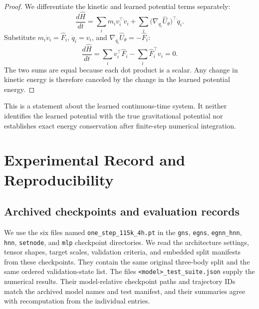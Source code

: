 \documentclass[10pt,letterpaper,twocolumn]{article}
\newcommand{\Fhat}{\widehat F}
\newcommand{\Uhat}{\widehat U}
\numberwithin{equation}{section}
\begin{document}
\begin{proof}
We differentiate the kinetic and learned potential terms separately:
\[
\frac{d\widehat H}{dt}
=\sum_i m_iv_i^\top\dot v_i
+\sum_i\bigl(\nabla_{q_i}\Uhat_\theta\bigr)^\top\dot q_i.
\]
Substitute $m_i\dot v_i=\Fhat_i$, $\dot q_i=v_i$, and
$\nabla_{q_i}\Uhat_\theta=-\Fhat_i$:
\[
\frac{d\widehat H}{dt}
=\sum_i v_i^\top\Fhat_i-\sum_i\Fhat_i^\top v_i=0.
\]
The two sums are equal because each dot product is a scalar. Any change in kinetic energy is
therefore canceled by the change in the learned potential energy.
\end{proof}

This is a statement about the learned continuous-time system. It neither identifies the learned
potential with the true gravitational potential nor establishes exact energy conservation after
finite-step numerical integration.

\clearpage
\section{Experimental Record and Reproducibility}
\label{app:record}

\subsection{Archived checkpoints and evaluation records}

We use the six files named \texttt{one\_step\_115k\_4h.pt} in the \texttt{gns}, \texttt{egns},
\texttt{egnn\_hnn}, \texttt{hnn}, \texttt{setnode}, and \texttt{mlp} checkpoint directories. We read
the architecture settings, tensor shapes, target scales, validation criteria, and embedded split
manifests from these checkpoints. They contain the same original three-body split and the same
ordered validation-state list. The files \texttt{<model>\_test\_suite.json} supply the numerical
results. Their model-relative checkpoint paths and trajectory IDs match the archived model names
and test manifest, and their summaries agree with recomputation from the individual entries.
\end{document}
